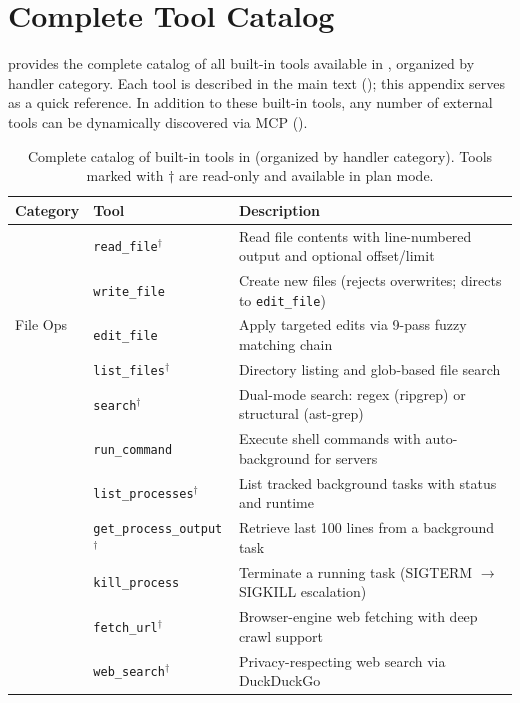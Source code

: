 \section{Complete Tool Catalog}
\label{app:tools}

 provides the complete catalog of all built-in tools available in \name, organized by handler category. Each tool is described in the main text (); this appendix serves as a quick reference. In addition to these built-in tools, any number of external tools can be dynamically discovered via MCP ().

\begin{table}[h]
\centering
\caption{Complete catalog of built-in tools in \name (organized by handler category). Tools marked with $\dagger$ are read-only and available in plan mode.}
\label{tab:full_tools}
\footnotesize
\begin{tabular}{@{}llp{4.8cm}@{}}
\toprule
\textbf{Category} & \textbf{Tool} & \textbf{Description} \\
\midrule
\multirow{5}{*}{File Ops}
& \texttt{read\_file}$^\dagger$ & Read file contents with line-numbered output and optional offset/limit \\
& \texttt{write\_file} & Create new files (rejects overwrites; directs to \texttt{edit\_file}) \\
& \texttt{edit\_file} & Apply targeted edits via 9-pass fuzzy matching chain \\
& \texttt{list\_files}$^\dagger$ & Directory listing and glob-based file search \\
& \texttt{search}$^\dagger$ & Dual-mode search: regex (ripgrep) or structural (ast-grep) \\
\addlinespace
\multirow{4}{*}{Process}
& \texttt{run\_command} & Execute shell commands with auto-background for servers \\
& \texttt{list\_processes}$^\dagger$ & List tracked background tasks with status and runtime \\
& \texttt{get\_process\_output}$^\dagger$ & Retrieve last 100 lines from a background task \\
& \texttt{kill\_process} & Terminate a running task (SIGTERM $\to$ SIGKILL escalation) \\
\addlinespace
\multirow{4}{*}{Web}
& \texttt{fetch\_url}$^\dagger$ & Browser-engine web fetching with deep crawl support \\
& \texttt{web\_search}$^\dagger$ & Privacy-respecting web search via DuckDuckGo \\

\end{tabular}
\end{table}
